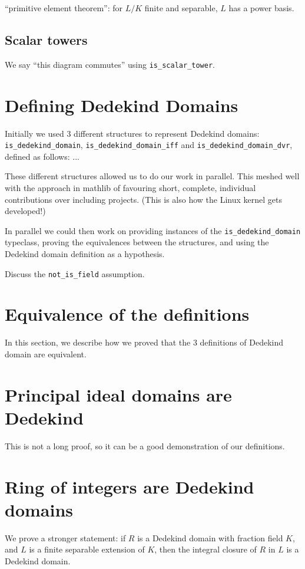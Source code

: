 \documentclass{lipics-v2021}
\newcommand{\lean}[1]{\texttt{#1}\xspace} %
\begin{document}
``primitive element theorem'': for $L / K$ finite and separable, $L$ has a power basis.

\subsection{Scalar towers}

We say ``this diagram commutes'' using \lean{is\_scalar\_tower}.

\section{Defining Dedekind Domains}

Initially we used 3 different structures to represent Dedekind domains: \lean{is\_dedekind\_domain}, \lean{is\_dedekind\_domain\_iff} and \lean{is\_dedekind\_domain\_dvr}, defined as follows:
...

These different structures allowed us to do our work in parallel. This meshed well with the approach in mathlib of favouring short, complete, individual contributions over including projects. (This is also how the Linux kernel gets developed!)

In parallel we could then work on providing instances of the \lean{is\_dedekind\_domain} typeclass, proving the equivalences between the structures, and using the Dedekind domain definition as a hypothesis.

Discuss the \lean{not\_is\_field} assumption.

\section{Equivalence of the definitions}

In this section, we describe how we proved that the 3 definitions of Dedekind domain are equivalent.

\section{Principal ideal domains are Dedekind}

This is not a long proof, so it can be a good demonstration of our definitions.

\section{Ring of integers are Dedekind domains}

We prove a stronger statement: if $R$ is a Dedekind domain with fraction field $K$, and $L$ is a finite separable extension of $K$, then the integral closure of $R$ in $L$ is a Dedekind domain.
\end{document}

